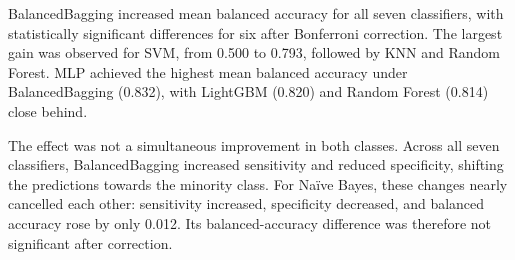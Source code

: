 \begin{table}[ht!]
  \centering
  \caption[BalancedBagging vs.\ single classifier (CV balanced accuracy)]{Cross-validation balanced accuracy under single-model and BalancedBagging configurations, with per-fold Wilcoxon signed-rank tests (Bonferroni-corrected for 7 comparisons). Differences use unrounded means. $^{***}p\leq0.001$; $^{**}0.001<p\leq0.01$; n.s.\ = not significant. Values are rounded to three decimals; the Decision Tree $p$-value is slightly above 0.001.}
  \label{tab:s2_bonferroni}
\end{table}

BalancedBagging increased mean balanced accuracy for all seven classifiers, with statistically significant differences for six after Bonferroni correction. The largest gain was observed for SVM, from 0.500 to 0.793, followed by KNN and Random Forest. MLP achieved the highest mean balanced accuracy under BalancedBagging (0.832), with LightGBM (0.820) and Random Forest (0.814) close behind.

The effect was not a simultaneous improvement in both classes. Across all seven classifiers, BalancedBagging increased sensitivity and reduced specificity, shifting the predictions towards the minority class. For Naïve Bayes, these changes nearly cancelled each other: sensitivity increased, specificity decreased, and balanced accuracy rose by only 0.012. Its balanced-accuracy difference was therefore not significant after correction.

